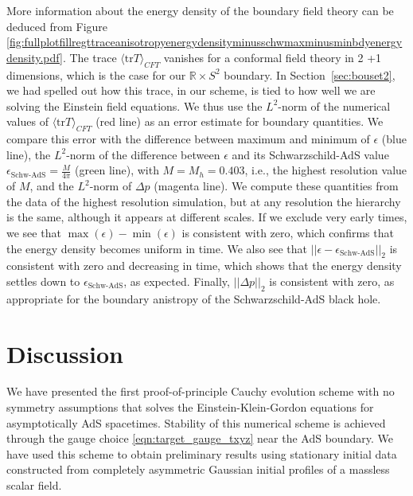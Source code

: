 \documentclass[aps,letterpaper,twocolumn,nofootinbib]{revtex4}
\numberwithin{equation}{section}
\begin{document}
More information about the energy density of the boundary field theory can be deduced from Figure \ref{fig:fullplotfillregttraceanisotropyenergydensityminusschwmaxminusminbdyenergydensity.pdf}. 
The trace $\langle \text{tr}T\rangle_{CFT}$ vanishes for a conformal field theory in 2 +1 dimensions, which is the case for our $\mathbb{R} \times S^2$ boundary.
In Section~\ref{sec:bouset2}, we had spelled out how this trace, in our scheme, is tied to how well we are solving the Einstein field equations.
We thus use the $L^2$-norm of the numerical values of $\langle \text{tr}T\rangle_{CFT}$ (red line) as an error estimate for boundary quantities. We compare this error with the difference between maximum and minimum of $\epsilon$ (blue line), the $L^2$-norm of the difference between $\epsilon$ and its Schwarzschild-AdS value $\epsilon_{\text{Schw-AdS}}=\frac{M}{4\pi}$ (green line), with $M=M_h=0.403$, i.e., the highest resolution value of $M$, and the $L^2$-norm of $\Delta p$ (magenta line). We compute these quantities from the data of the highest resolution simulation, but at any resolution the hierarchy is the same, although it appears at different scales.
If we exclude very early times, we see that $\max(\epsilon)-\min(\epsilon)$ is consistent with zero, which confirms that the energy density becomes uniform in time.
We also see that $||\epsilon-\epsilon_{\text{Schw-AdS}}||_2$ is consistent with zero and decreasing in time, which shows that the energy density settles down to $\epsilon_{\text{Schw-AdS}}$, as expected.
Finally, $||\Delta p||_2$ is consistent with zero, as appropriate for the boundary anistropy of the Schwarzschild-AdS black hole.



\section{Discussion}\label{sec:Discussion}

We have presented the first proof-of-principle Cauchy evolution scheme with no symmetry assumptions that solves the Einstein-Klein-Gordon equations for asymptotically AdS spacetimes. 
Stability of this numerical scheme is achieved through the gauge choice \eqref{eqn:target_gauge_txyz} near the AdS boundary. 
We have used this scheme to obtain preliminary results using stationary initial data constructed from completely asymmetric Gaussian initial profiles of a massless scalar field.
\end{document}
